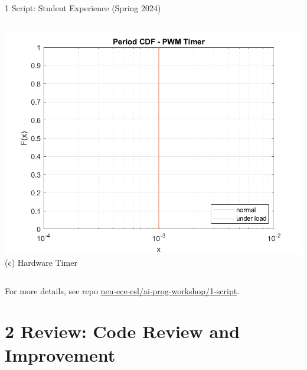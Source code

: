 \documentclass[xcolor=dvipsnames, aspectratio=169]{beamer}
\newcommand{\footername}{AI in Programming Education}
\newcommand{\setfooter}[2]{\renewcommand{\footername}{\href{#2}{#1}}}
\begin{document}
\begin{frame}{1 Script: Student Experience (Spring 2024)}
\begin{columns}
        \includegraphics[width=\textwidth]{../1-script/period_timer.png}
        \tiny\centering (c) Hardware Timer
    \end{columns}
    \vspace{0.5em}
    \tiny For more details, see repo \href{https://github.com/neu-ece-esl/ai-prog-workshop/tree/main/1-script}{neu-ece-esl/ai-prog-workshop/1-script}.  
\end{frame}


\section{2 Review: Code Review and Improvement}
\setfooter{2 Review}{https://github.com/neu-ece-esl/ai-prog-workshop/tree/main/2-review}
\end{document}
